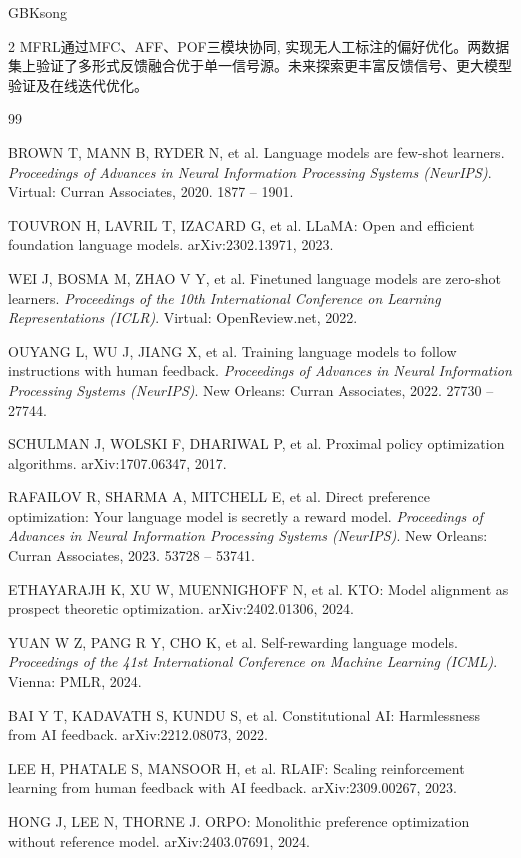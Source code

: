\begin{CJK*}{GBK}{song}
\begin{multicols}{2}
MFRL通过MFC、AFF、POF三模块协同, 实现无人工标注的偏好优化。两数据集上验证了多形式反馈融合优于单一信号源。未来探索更丰富反馈信号、更大模型验证及在线迭代优化。

{\fontsize{7.8pt}{9.4pt}\selectfont
\begin{thebibliography}{99} \vskip 7pt
\setlength{\parskip}{-2pt}

 BROWN T, MANN B, RYDER N, et al. Language models are few-shot learners. {\it Proceedings of Advances in Neural Information Processing Systems (NeurIPS)}. Virtual: Curran Associates, 2020. 1877 -- 1901.

 TOUVRON H, LAVRIL T, IZACARD G, et al. LLaMA: Open and efficient foundation language models. arXiv:2302.13971, 2023.

 WEI J, BOSMA M, ZHAO V Y, et al. Finetuned language models are zero-shot learners. {\it Proceedings of the 10th International Conference on Learning Representations (ICLR)}. Virtual: OpenReview.net, 2022.

 OUYANG L, WU J, JIANG X, et al. Training language models to follow instructions with human feedback. {\it Proceedings of Advances in Neural Information Processing Systems (NeurIPS)}. New Orleans: Curran Associates, 2022. 27730 -- 27744.

 SCHULMAN J, WOLSKI F, DHARIWAL P, et al. Proximal policy optimization algorithms. arXiv:1707.06347, 2017.

 RAFAILOV R, SHARMA A, MITCHELL E, et al. Direct preference optimization: Your language model is secretly a reward model. {\it Proceedings of Advances in Neural Information Processing Systems (NeurIPS)}. New Orleans: Curran Associates, 2023. 53728 -- 53741.

 ETHAYARAJH K, XU W, MUENNIGHOFF N, et al. KTO: Model alignment as prospect theoretic optimization. arXiv:2402.01306, 2024.

 YUAN W Z, PANG R Y, CHO K, et al. Self-rewarding language models. {\it Proceedings of the 41st International Conference on Machine Learning (ICML)}. Vienna: PMLR, 2024.

 BAI Y T, KADAVATH S, KUNDU S, et al. Constitutional AI: Harmlessness from AI feedback. arXiv:2212.08073, 2022.

 LEE H, PHATALE S, MANSOOR H, et al. RLAIF: Scaling reinforcement learning from human feedback with AI feedback. arXiv:2309.00267, 2023.

 HONG J, LEE N, THORNE J. ORPO: Monolithic preference optimization without reference model. arXiv:2403.07691, 2024.


\end{thebibliography}}
\end{multicols}
\end{CJK*}
